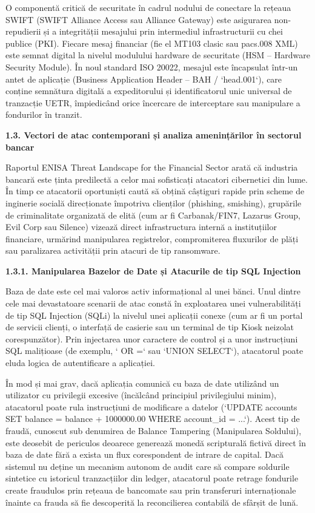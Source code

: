 \documentclass[
]{article}
\begin{document}
O componentă critică de securitate în cadrul nodului de conectare la
rețeaua SWIFT (SWIFT Alliance Access sau Alliance Gateway) este
asigurarea non-repudierii și a integrității mesajului prin intermediul
infrastructurii cu chei publice (PKI). Fiecare mesaj financiar (fie el
MT103 clasic sau pacs.008 XML) este semnat digital la nivelul modulului
hardware de securitate (HSM -- Hardware Security Module). În noul
standard ISO 20022, mesajul este încapsulat într-un antet de aplicație
(Business Application Header -- BAH / `head.001`), care conține
semnătura digitală a expeditorului și identificatorul unic universal de
tranzacție UETR, împiedicând orice încercare de interceptare sau
manipulare a fondurilor în tranzit.

\textbf{1.3. Vectori de atac contemporani și analiza amenințărilor în
sectorul bancar}

Raportul ENISA Threat Landscape for the Financial Sector arată că
industria bancară este ținta predilectă a celor mai sofisticați
atacatori cibernetici din lume. În timp ce atacatorii oportuniști caută
să obțină câștiguri rapide prin scheme de inginerie socială direcționate
împotriva clienților (phishing, smishing), grupările de criminalitate
organizată de elită (cum ar fi Carbanak/FIN7, Lazarus Group, Evil Corp
sau Silence) vizează direct infrastructura internă a instituțiilor
financiare, urmărind manipularea registrelor, compromiterea fluxurilor
de plăți sau paralizarea activității prin atacuri de tip ransomware.

\textbf{1.3.1. Manipularea Bazelor de Date și Atacurile de tip SQL
Injection}

Baza de date este cel mai valoros activ informațional al unei bănci.
Unul dintre cele mai devastatoare scenarii de atac constă în exploatarea
unei vulnerabilități de tip SQL Injection (SQLi) la nivelul unei
aplicații conexe (cum ar fi un portal de servicii clienți, o interfață
de casierie sau un terminal de tip Kiosk neizolat corespunzător). Prin
injectarea unor caractere de control și a unor instrucțiuni SQL
malițioase (de exemplu, `\textquotesingle{} OR
\textquotesingle=` sau `UNION
SELECT`), atacatorul poate eluda logica de autentificare a aplicației.

În mod și mai grav, dacă aplicația comunică cu baza de date utilizând un
utilizator cu privilegii excesive (încălcând principiul privilegiului
minim), atacatorul poate rula instrucțiuni de modificare a datelor
(`UPDATE accounts SET balance = balance + 1000000.00 WHERE account\_id =
\textquotesingle...\textquotesingle`). Acest tip de fraudă, cunoscut sub
denumirea de Balance Tampering (Manipularea Soldului), este deosebit de
periculos deoarece generează monedă scripturală fictivă direct în baza
de date fără a exista un flux corespondent de intrare de capital. Dacă
sistemul nu deține un mecanism autonom de audit care să compare
soldurile sintetice cu istoricul tranzacțiilor din ledger, atacatorul
poate retrage fondurile create fraudulos prin rețeaua de bancomate sau
prin transferuri internaționale înainte ca frauda să fie descoperită la
reconcilierea contabilă de sfârșit de lună.
\end{document}
